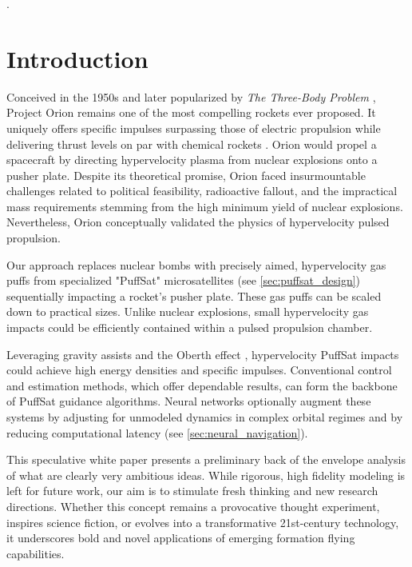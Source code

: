 \documentclass{article}
\begin{document}
\begin{abstract}
\begin{table}[!htpb]
\begin{tabularx}{\textwidth}{|c|L|}
        \textbf{Cosmic Commutes} & We'll  build fusion powered spaceships with Earth-like artificial gravity that travel on brachistochrone trajectories with constant acceleration and deceleration between destinations.  \autoref{sec:epstein_drives}\\\hline
    \end{tabularx}
\end{table}
\end{abstract}.  

\section{Introduction}
Conceived in the 1950s and later popularized by \textit{The Three-Body Problem} \cite{liu2014three}, Project Orion remains one of the most compelling rockets ever proposed. It uniquely offers specific impulses surpassing those of electric propulsion while delivering thrust levels on par with chemical rockets \cite{projorion}.   Orion would propel a spacecraft by directing hypervelocity plasma from nuclear explosions onto a pusher plate. Despite its theoretical promise, Orion faced insurmountable challenges related to political feasibility, radioactive fallout, and the impractical mass requirements stemming from the high minimum yield of nuclear explosions. Nevertheless, Orion conceptually validated the physics of hypervelocity pulsed propulsion.   

Our approach replaces nuclear bombs with precisely aimed, hypervelocity gas puffs from specialized "PuffSat" microsatellites (see \autoref{sec:puffsat_design}) sequentially impacting a rocket's pusher plate.  These gas puffs can be scaled down to practical sizes.  Unlike nuclear explosions, small hypervelocity gas impacts could be efficiently contained within a pulsed propulsion chamber.

Leveraging gravity assists and the Oberth effect \cite{oberth_effect}, hypervelocity PuffSat impacts could achieve high energy densities and specific impulses.  Conventional control and estimation methods, which offer dependable results, can form the backbone of PuffSat guidance algorithms.  Neural networks optionally augment these systems by adjusting for unmodeled dynamics in complex orbital regimes and by reducing computational latency (see \autoref{sec:neural_navigation}).  

This speculative white paper presents a preliminary back of the envelope analysis of what are clearly very ambitious ideas. While rigorous, high fidelity modeling is left for future work, our aim is to stimulate fresh thinking and new research directions. Whether this concept remains a provocative thought experiment, inspires science fiction, or evolves into a transformative 21st-century technology, it underscores bold and novel applications of emerging formation flying capabilities. 
\end{document}
